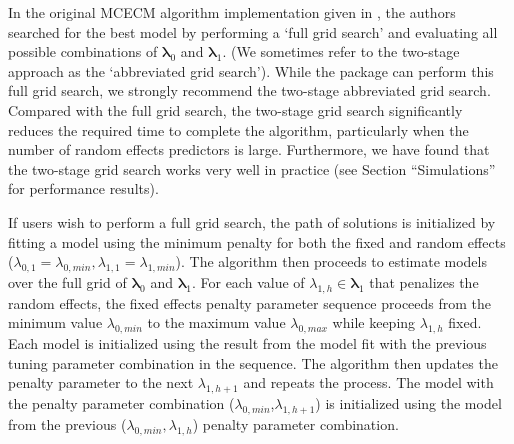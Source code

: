 In the original MCECM algorithm implementation given in \cite{rashid2020}, the authors searched for the best model by performing a `full grid search' and evaluating all possible combinations of $\boldsymbol \lambda_0$ and $\boldsymbol \lambda_1$. (We sometimes refer to the two-stage approach as the `abbreviated grid search'). While the  package can perform this full grid search, we strongly recommend the two-stage abbreviated grid search. Compared with the full grid search, the two-stage grid search significantly reduces the required time to complete the algorithm, particularly when the number of random effects predictors is large. Furthermore, we have found that the two-stage grid search works very well in practice (see Section
``Simulations'' for performance results).

If users wish to perform a full grid search, the path of solutions is initialized by fitting a model using the minimum penalty for both the fixed and random effects
(\(\lambda_{0,1} = \lambda_{0,min}, \lambda_{1,1} = \lambda_{1,min}\)).
The algorithm then proceeds to estimate models over the full grid of
\(\boldsymbol \lambda_0\) and \(\boldsymbol \lambda_1\). For each value
of \(\lambda_{1,h} \in \boldsymbol \lambda_1\) that penalizes the random
effects, the fixed effects penalty parameter sequence proceeds from the
minimum value \(\lambda_{0,min}\) to the maximum value
\(\lambda_{0,max}\) while keeping \(\lambda_{1,h}\) fixed. Each model is initialized using
the result from the model fit with the previous tuning parameter combination in the sequence. The algorithm then updates the
penalty parameter to the next \(\lambda_{1,h+1}\) and repeats the
process. The model with the penalty parameter combination (\(\lambda_{0,min}\),\(\lambda_{1,h+1}\)) is initialized using the model from the previous ($\lambda_{0,min},\lambda_{1,h}$) penalty parameter combination.


